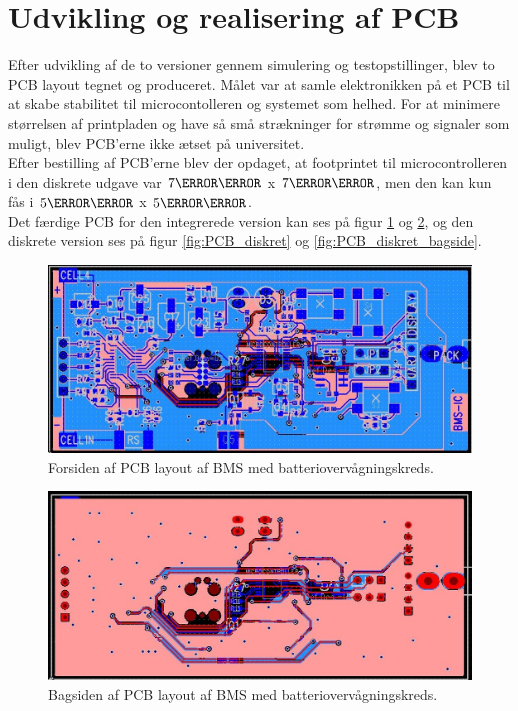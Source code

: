 \section{Udvikling og realisering af PCB}
Efter udvikling af de to versioner gennem simulering og testopstillinger, blev to PCB layout tegnet og produceret. Målet var at samle elektronikken på et PCB til at skabe stabilitet til microcontolleren og systemet som helhed. For at minimere størrelsen af printpladen og have så små strækninger for strømme og signaler som muligt, blev PCB'erne ikke ætset på universitet.
\\

Efter bestilling af PCB'erne blev der opdaget, at footprintet til microcontrolleren i den diskrete udgave var $7\milli\meter$ x  $7\milli\meter$, men den kan kun fås i $5\milli\meter$ x $5\milli\meter$.
\\

Det færdige PCB for den integrerede version kan ses på figur \ref{fig:PCB_IC} og \ref{fig:PCB_IC_bagside}, og den diskrete version ses på figur \ref{fig:PCB_diskret} og \ref{fig:PCB_diskret_bagside}.

\begin{figure}[h]
	\centering
	\includegraphics[width=15cm]{billeder/IC_1.jpg}
	\caption{Forsiden af PCB layout af BMS med batteriovervågningskreds.}
	\label{fig:PCB_IC}
\end{figure}

\begin{figure}[h]
	\centering
	\includegraphics[width=15cm]{billeder/IC_2.jpg}
	\caption{Bagsiden af PCB layout af BMS med batteriovervågningskreds.}
	\label{fig:PCB_IC_bagside}
\end{figure}

